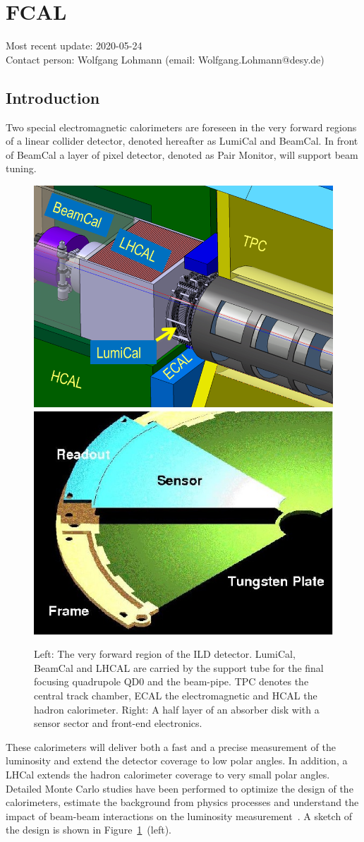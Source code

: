\section{FCAL}
Most recent update: 2020-05-24 \\
Contact person: Wolfgang Lohmann (email: Wolfgang.Lohmann@desy.de)

\subsection{Introduction}
Two special electromagnetic calorimeters are foreseen in the very forward regions of a linear collider detector, denoted hereafter as
LumiCal and BeamCal. In front of BeamCal a layer of pixel detector, denoted as Pair Monitor, will support beam tuning.
\begin{figure}[hbp]
  \centering
   \includegraphics[width=0.45\columnwidth]{Calorimeter/FCAL/figs/forward_region_new} \hfill
   \includegraphics[width=0.45\columnwidth]{Calorimeter/FCAL/figs/BClayer}
  \caption{Left: The very forward region of the ILD detector.
  LumiCal, BeamCal and LHCAL are carried by
  the support tube for the final focusing quadrupole QD0 and the beam-pipe.
  TPC denotes the central track chamber, ECAL the electromagnetic and
  HCAL the hadron calorimeter.
  Right: A half layer of an absorber disk with a sensor sector and front-end electronics.}
  \label{fig:Forward_structure}
\end{figure}
These calorimeters will deliver both a fast and a precise measurement of the luminosity
and extend the detector coverage to low polar angles.
In addition, a LHCal extends the hadron calorimeter coverage to very small polar angles.
Detailed Monte Carlo studies have been performed to
optimize the design of the calorimeters, estimate the background from physics processes and understand the impact
of beam-beam interactions on the luminosity measurement~\cite{2010JInst...512002A}.
A sketch of the design is shown in Figure~\ref{fig:Forward_structure}~(left).


